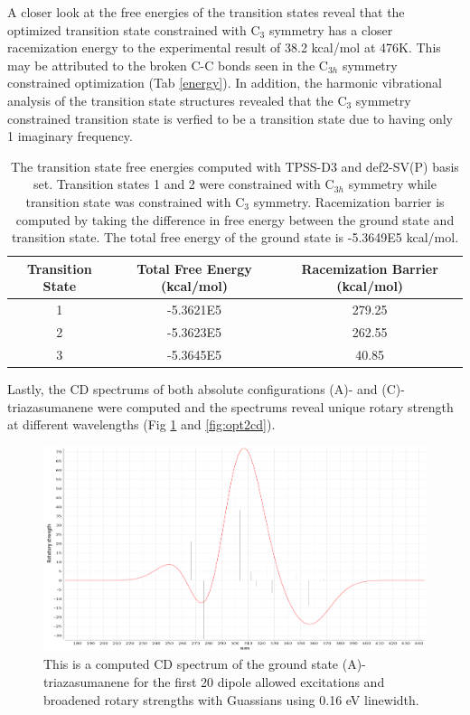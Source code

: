 \documentclass[11pt]{article}
\begin{document}
A closer look at the free energies of the transition states reveal that the
optimized transition state constrained with C$_3$ symmetry has a closer
racemization energy to the experimental result of 38.2 kcal/mol at
476K\cite{doi:10.1246/bcsj.20170384}. This may be attributed to the broken C-C
bonds seen in the C$_{3h}$ symmetry constrained optimization (Tab \ref{energy}).
In addition, the harmonic vibrational analysis of the transition state structures
revealed that the C$_3$ symmetry constrained transition state is verfied to be
a transition state due to having only 1 imaginary frequency.

\begin{table}[H]
  \caption{The transition state free energies computed with TPSS-D3 and def2-SV(P)
    basis set. Transition states 1 and 2 were constrained with C$_{3h}$ symmetry while
    transition state was constrained with C$_3$ symmetry. Racemization barrier is
    computed by taking the difference in free energy between the ground state and
    transition state. The total free energy of the ground state is -5.3649E5 kcal/mol.}
  \begin{tabular}{c|cc}
    Transition State & Total Free Energy (kcal/mol) & Racemization Barrier (kcal/mol) \\
    \hline\hline
    1 & -5.3621E5 & 279.25\\
    2 & -5.3623E5 & 262.55\\
    3 & -5.3645E5 & 40.85\\
  \end{tabular}
  \label{tab:energy}
\end{table}

Lastly, the CD spectrums of both absolute configurations (A)- and (C)-triazasumanene
were computed and the spectrums reveal unique rotary strength at different wavelengths
(Fig \ref{fig:cdspec} and \ref{fig:opt2cd}).

\begin{figure}[H]
  \center
  \includegraphics[scale=0.2]{cd_spec.png}
  \caption{This is a computed CD spectrum of the ground state (A)-triazasumanene for the
    first 20 dipole allowed excitations and broadened rotary strengths with Guassians
    using 0.16 eV linewidth.}
  \label{fig:cdspec}
\end{figure}
\end{document}
